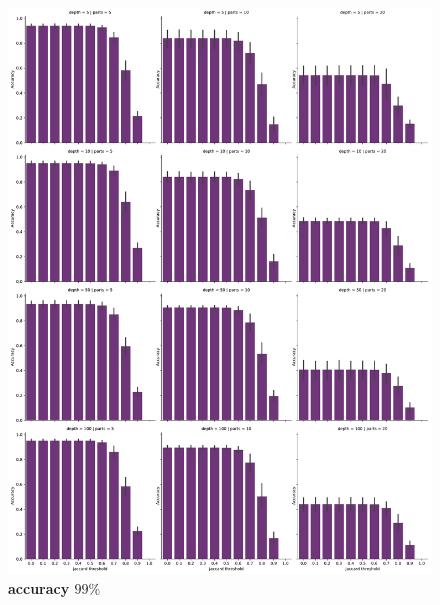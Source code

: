 \documentclass[11pt, a4paper]{article}
\begin{document}
\begin{figure}[ht]
    \begin{center}
    \includegraphics[width=1\textwidth]{../results/images_notebook/v_322/99_good_reads_true_positves.pdf}
    \end{center}
    \caption{{\bf accuracy $99\%$}}
   \label{fig:v_320_accuracy_99}
\end{figure}
\end{document}
